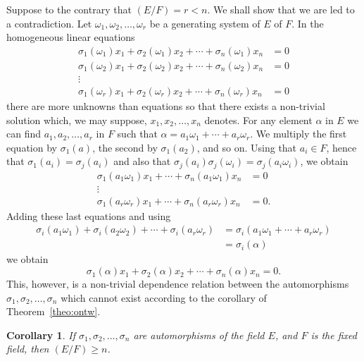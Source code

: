 \documentclass[10pt,leqno,a5paper]{book}
\newtheorem*{coro*}{Corollary}
\theoremstyle{definition}
\begin{document}
Suppose to the contrary that $(E/F) = r < n$.
We shall show that we are led to a contradiction.
Let $\omega_1, \omega_2, \ldots, \omega_r$ be a generating system of $E$ of $F$.
In the homogeneous linear equations
\begin{align*}
\sigma_1(\omega_1)x_1 + \sigma_2(\omega_1)x_2 + \cdots + \sigma_n(\omega_1)x_n &= 0
\\
\sigma_1(\omega_2)x_1 + \sigma_2(\omega_2)x_2 + \cdots + \sigma_n(\omega_2)x_n &= 0
\\
\vdots &
\\
\sigma_1(\omega_r)x_1 + \sigma_2(\omega_r)x_2 + \cdots + \sigma_n(\omega_r)x_n &= 0
\end{align*}
there are more unknowns than equations so that there exists a non-trivial solution which, we may suppose, $x_1, x_2, \ldots, x_n$ denotes.
For any element $\alpha$ in $E$ we can find $a_1, a_2, \ldots, a_r$ in $F$ such that $\alpha = a_1 \omega_1 + \cdots + a_r \omega_r$.
We multiply the first equation by $\sigma_1(a)$, the second by $\sigma_1(a_2)$, and so on.
Using that $a_i \in F$, hence that $\sigma_1(a_i) = \sigma_j(a_i)$ and also that $\sigma_j(a_i) \sigma_j(\omega_i) = \sigma_j(a_i \omega_i)$, we obtain
\begin{align*}
\sigma_1(a_1 \omega_1)x_1 + \cdots + \sigma_n(a_1 \omega_1)x_n &= 0
\\
\vdots &
\\
\sigma_1(a_r \omega_r)x_1 + \cdots + \sigma_n(a_r \omega_r)x_n &= 0.
\end{align*}
Adding these last equations and using
\begin{align*}
\sigma_i(a_1 \omega_1) + \sigma_i(a_2 \omega_2) + \cdots + \sigma_i(a_r \omega_r)
&= \sigma_i(a_1 \omega_1 + \cdots + a_r \omega_r)
\\
&= \sigma_i(\alpha)
\end{align*}
we obtain
\[
\sigma_1(\alpha)x_1 + \sigma_2(\alpha)x_2 + \cdots + \sigma_n(\alpha)x_n = 0.
\]
This, however, is a non-trivial dependence relation between the automorphisms $\sigma_1, \sigma_2, \ldots, \sigma_n$ which cannot exist according to the corollary of Theorem~\ref{theo:ontw}.


\begin{coro*}
If $\sigma_1, \sigma_2, \ldots, \sigma_n$ are automorphisms of the field $E$, and $F$ is the fixed field, then $(E/F) \geq n$.
\end{coro*}
\end{document}
